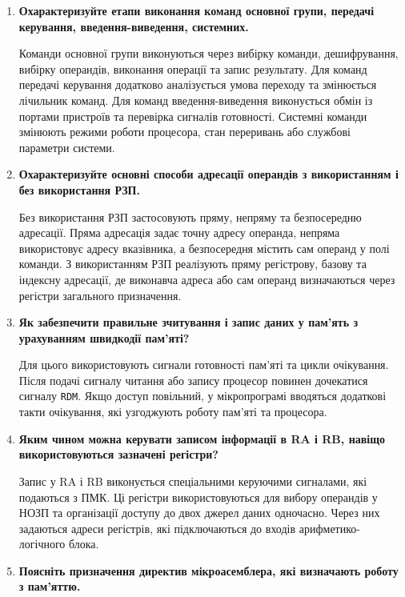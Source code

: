 \documentclass[12pt,a4paper]{article}
\begin{document}
\begin{enumerate}
    \item \textbf{Охарактеризуйте етапи виконання команд основної групи, передачі
    керування, введення-виведення, системних.}

    Команди основної групи виконуються через вибірку команди, дешифрування,
    вибірку операндів, виконання операції та запис результату. Для команд передачі
    керування додатково аналізується умова переходу та змінюється лічильник команд.
    Для команд введення-виведення виконується обмін із портами пристроїв та
    перевірка сигналів готовності. Системні команди змінюють режими роботи
    процесора, стан переривань або службові параметри системи.

    \item \textbf{Охарактеризуйте основні способи адресації операндів з використанням і без використання РЗП.}

    Без використання РЗП застосовують пряму, непряму та безпосередню адресації.
    Пряма адресація задає точну адресу операнда, непряма використовує адресу
    вказівника, а безпосередня містить сам операнд у полі команди. З використанням
    РЗП реалізують пряму регістрову, базову та індексну адресації, де виконавча
    адреса або сам операнд визначаються через регістри загального призначення.

    \item \textbf{Як забезпечити правильне зчитування і запис даних у пам'ять з урахуванням швидкодії пам'яті?}

    Для цього використовують сигнали готовності пам'яті та цикли очікування.
    Після подачі сигналу читання або запису процесор повинен дочекатися сигналу
    \texttt{RDM}. Якщо доступ повільний, у мікропрограмі вводяться додаткові такти
    очікування, які узгоджують роботу пам'яті та процесора.

    \item \textbf{Яким чином можна керувати записом інформації в RA і RB, навіщо використовуються зазначені регістри?}

    Запис у RA і RB виконується спеціальними керуючими сигналами, які подаються
    з ПМК. Ці регістри використовуються для вибору операндів у НОЗП та організації
    доступу до двох джерел даних одночасно. Через них задаються адреси регістрів,
    які підключаються до входів арифметико-логічного блока.

    \item \textbf{Поясніть призначення директив мікроасемблера, які визначають роботу з пам'яттю.}


\end{enumerate}
\end{document}
